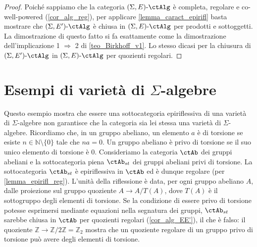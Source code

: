 \begin{proof}
 Poiché sappiamo che la categoria \(\ctSEAlg\) è completa, regolare e co-well-powered (\ref{cor_alg_reg}), per
 applicare \ref{lemma_caract_epirifl} basta mostrare che \(\ctSEEAlg\) è chiusa in \(\ctSEAlg\) per prodotti e sottoggetti.
 La dimostrazione di questo fatto si fa esattamente come la dimostrazione dell'implicazione 1 \(\Rightarrow\) 2 di
 \ref{teo_Birkhoff_v1}. Lo stesso dicasi per la chiusura di \(\ctSEEAlg\) in \(\ctSEAlg\) per quozienti regolari.
\end{proof}


\section{Esempi di varietà di \(\Sigma\)-algebre}\label{sec_ex_var_SAlg}

\begin{example}\label{esempio_torsionfree}
 Questo esempio mostra che essere una sottocategoria epiriflessiva di una varietà di \(\Sigma\)-algebre non garantisce che la
 categoria sia lei stessa una varietà di \(\Sigma\)-algebre. Ricordiamo che, in un gruppo abeliano,  un elemento \(a\) è di torsione
 se esiste \(n \in \mathbb N \setminus \{0\}\) tale che \(na=0\). Un gruppo abeliano è privo di torsione se il suo unico elemento di
 torsione è 0. Consideriamo la categoria \(\ctAb\) dei gruppi abeliani e la sottocategoria piena \(\ctAb_{st}\) dei gruppi abeliani privi
 di torsione. La sottocategoria \(\ctAb_{st}\) è epiriflessiva in \(\ctAb\) ed è dunque regolare (per \ref{lemma_epirifl_reg}).
 L'unità della riflessione è data, per ogni gruppo abeliano \(A\),
 dalle proiezione sul gruppo quoziente \(A \to A/T(A)\), dove \(T(A)\) è il sottogruppo degli elementi di torsione. Se la condizione di
 essere privo di torsione potesse esprimersi mediante equazioni nella segnatura dei gruppi, \(\ctAb_{st}\) sarebbe chiusa in \(\ctAb\)
 per quozienti regolari (\ref{cor_alg_EE'}), il che è falso: il quoziente \(\mathbb Z \to \mathbb Z / 2 \mathbb Z = \mathbb Z_2\)
 mostra che un  quoziente regolare di un gruppo privo di torsione può avere degli elementi di torsione.
\end{example}


